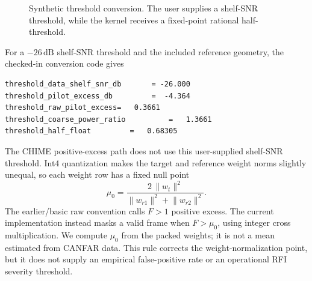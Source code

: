 \documentclass[10pt,letterpaper]{article}
\newcommand{\dB}{\,\mathrm{dB}}
\begin{document}
\begin{figure}[H]
\centering
{}
\caption{Synthetic threshold conversion. The user supplies a shelf-SNR threshold, while the kernel receives a fixed-point rational half-threshold.}
\label{fig:threshold_conversion}
\end{figure}


For a \(-26\dB\) shelf-SNR threshold and the included reference geometry, the checked-in conversion code gives
\begin{lstlisting}[style=shell]
threshold_data_shelf_snr_db       = -26.000
threshold_pilot_excess_db         =  -4.364
threshold_raw_pilot_excess=   0.3661
threshold_coarse_power_ratio          =   1.3661
threshold_half_float         =   0.68305
\end{lstlisting}

The CHIME positive-excess path does not use this user-supplied shelf-SNR
threshold. Int4 quantization makes the target and reference weight norms
slightly unequal, so each weight row has a fixed null point
\begin{equation}
\mu_0=\frac{2\,\lVert w_t\rVert^2}
{\lVert w_{r1}\rVert^2+\lVert w_{r2}\rVert^2}.
\end{equation}
The earlier/basic raw convention calls \(F>1\) positive excess. The current implementation instead masks a valid frame when \(F>\mu_0\), using integer cross
multiplication. We compute \(\mu_0\) from the packed weights; it is not a mean
estimated from CANFAR data. This rule corrects the weight-normalization point,
but it does not supply an empirical false-positive rate or an operational RFI
severity threshold.
\end{document}
